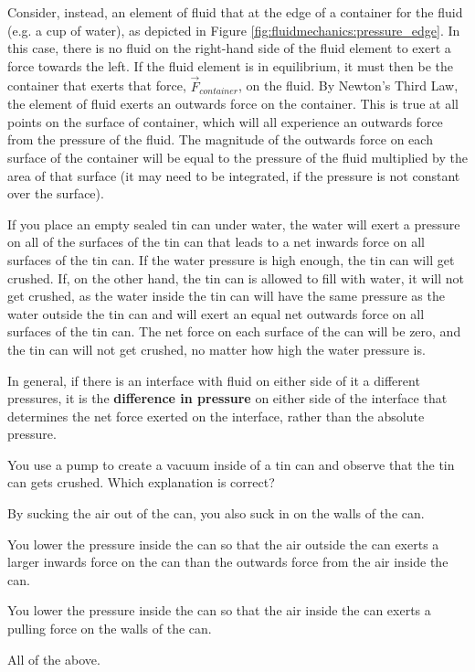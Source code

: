Consider, instead, an element of fluid that at the edge of a container for the fluid (e.g. a cup of water), as depicted in Figure \ref{fig:fluidmechanics:pressure_edge}.
In this case, there is no fluid on the right-hand side of the fluid element to exert a force towards the left. If the fluid element is in equilibrium, it must then be the container that exerts that force, $\vec F_{container}$, on the fluid. By Newton's Third Law, the element of fluid exerts an outwards force on the container. This is true at all points on the surface of container, which will all experience an outwards force from the pressure of the fluid. The magnitude of the outwards force on each surface of the container will be equal to the pressure of the fluid multiplied by the area of that surface (it may need to be integrated, if the pressure is not constant over the surface). 

If you place an empty sealed tin can under water, the water will exert a pressure on all of the surfaces of the tin can that leads to a net inwards force on all surfaces of the tin can. If the water pressure is high enough, the tin can will get crushed. If, on the other hand, the tin can is allowed to fill with water, it will not get crushed, as the water inside the tin can will have the same pressure as the water outside the tin can and will exert an equal net outwards force on all surfaces of the tin can. The net force on each surface of the can will be zero, and the tin can will not get crushed, no matter how high the water pressure is. 

In general, if there is an interface with fluid on either side of it a different pressures, it is the \textbf{difference in pressure} on either side of the interface that determines the net force exerted on the interface, rather than the absolute pressure.

\begin{checkpoint}
\begin{MCquestion}{You use a pump to create a vacuum inside of a tin can and observe that the tin can gets crushed. Which explanation is correct?}
\item By sucking the air out of the can, you also suck in on the walls of the can. 
\item You lower the pressure inside the can so that the air outside the can exerts a larger inwards force on the can than the outwards force from the air inside the can. \correct
\item You lower the pressure inside the can so that the air inside the can exerts a pulling force on the walls of the can.
\item All of the above. 
\end{MCquestion}
\end{checkpoint}

